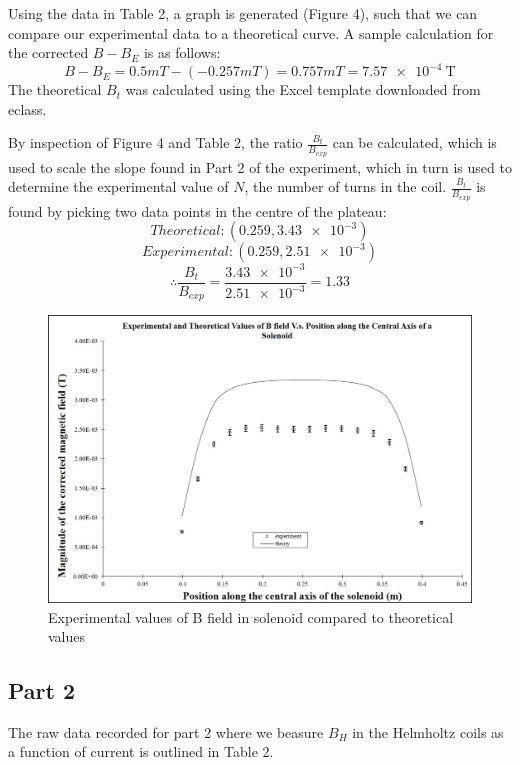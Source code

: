 \documentclass[letterpaper]{article}
\begin{document}
Using the data in Table 2, a graph is generated (Figure 4), such that we can compare our
experimental data to a theoretical curve. A sample calculation for the corrected $B-B_E$
is as follows:
$$ B-B_E = 0.5 mT - (-0.257 mT) = 0.757 mT = \SI{7.57e-4}{\tesla}$$
The theoretical $B_t$ was calculated using the Excel template downloaded from eclass.

By inspection of Figure 4 and Table 2, the ratio $\frac{B_t}{B_{exp}}$ can
be calculated, which is used to scale the slope found in Part 2 of the experiment,
which in turn is used to determine the experimental value of $N$, the number of turns in the coil.
$\frac{B_t}{B_{exp}}$ is found by picking two data points in the centre of the plateau:
$${Theoretical: } (0.259, \num{3.43e-3})$$
$${Experimental: } (0.259, \num{2.51e-3})$$
$$\therefore \frac{B_t}{B_{exp}}= \frac{\num{3.43e-3}}{\num{2.51e-3}}=1.33$$
\begin{figure}[H]
    \centering
    \includegraphics[width=\textwidth]{part1graph.jpg}
    \caption{Experimental values of B field in solenoid compared to theoretical values}
\end{figure}


\subsection{Part 2}

The raw data recorded for part 2 where we beasure $B_H$ in the
Helmholtz coils as a function of current is outlined in Table 2.
\end{document}
